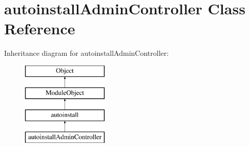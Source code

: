 \hypertarget{classautoinstallAdminController}{}\section{autoinstall\+Admin\+Controller Class Reference}
\label{classautoinstallAdminController}
Inheritance diagram for autoinstall\+Admin\+Controller\+:\begin{figure}[H]
\begin{center}
\leavevmode
\includegraphics[height=4.000000cm]{classautoinstallAdminController}
\end{center}
\end{figure}
